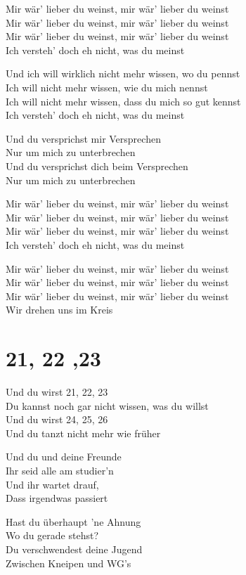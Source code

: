 \documentclass[]{book}
\begin{document}
Mir wär' lieber du weinst, mir wär' lieber du weinst\\
Mir wär' lieber du weinst, mir wär' lieber du weinst\\
Mir wär' lieber du weinst, mir wär' lieber du weinst\\
Ich versteh' doch eh nicht, was du meinst

Und ich will wirklich nicht mehr wissen, wo du pennst\\
Ich will nicht mehr wissen, wie du mich nennst\\
Ich will nicht mehr wissen, dass du mich so gut kennst\\
Ich versteh' doch eh nicht, was du meinst

Und du versprichst mir Versprechen\\
Nur um mich zu unterbrechen\\
Und du versprichst dich beim Versprechen\\
Nur um mich zu unterbrechen

Mir wär' lieber du weinst, mir wär' lieber du weinst\\
Mir wär' lieber du weinst, mir wär' lieber du weinst\\
Mir wär' lieber du weinst, mir wär' lieber du weinst\\
Ich versteh' doch eh nicht, was du meinst

Mir wär' lieber du weinst, mir wär' lieber du weinst\\
Mir wär' lieber du weinst, mir wär' lieber du weinst\\
Mir wär' lieber du weinst, mir wär' lieber du weinst\\
Wir drehen uns im Kreis

\hypertarget{section-3}{%
\section{21, 22 ,23}\label{section-3}}

Und du wirst 21, 22, 23\\
Du kannst noch gar nicht wissen, was du willst\\
Und du wirst 24, 25, 26\\
Und du tanzt nicht mehr wie früher

Und du und deine Freunde\\
Ihr seid alle am studier'n\\
Und ihr wartet drauf,\\
Dass irgendwas passiert

Hast du überhaupt 'ne Ahnung\\
Wo du gerade stehst?\\
Du verschwendest deine Jugend\\
Zwischen Kneipen und WG's
\end{document}
